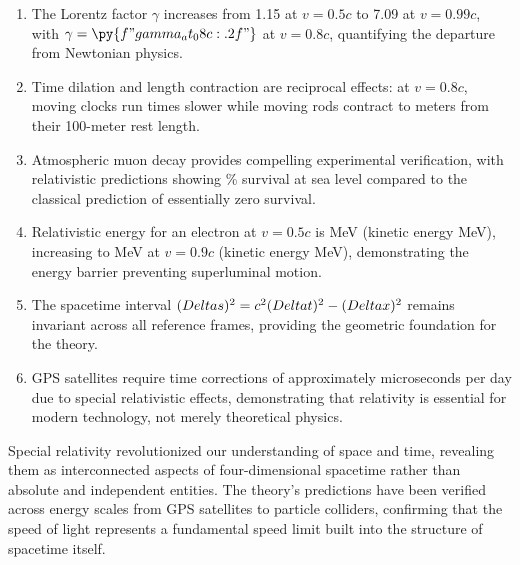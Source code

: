 \documentclass[a4paper, 11pt]{article}
\begin{document}
\begin{enumerate}
\item The Lorentz factor $\gamma$ increases from 1.15 at $v=0.5c$ to 7.09 at $v=0.99c$, with
$\gamma = \py{f"{gamma_at_08c:.2f}"}$ at $v=0.8c$, quantifying the departure from Newtonian physics.

\item Time dilation and length contraction are reciprocal effects: at $v=0.8c$, moving clocks
run  times slower while moving rods contract to
 meters from their 100-meter rest length.

\item Atmospheric muon decay provides compelling experimental verification, with relativistic
predictions showing \% survival at sea level
compared to the classical prediction of essentially zero survival.

\item Relativistic energy for an electron at $v=0.5c$ is  MeV
(kinetic energy  MeV), increasing to  MeV
at $v=0.9c$ (kinetic energy  MeV), demonstrating the energy barrier
preventing superluminal motion.

\item The spacetime interval $(\\Delta s)^2 = c^2(\\Delta t)^2 - (\\Delta x)^2$ remains
invariant across all reference frames, providing the geometric foundation for the theory.

\item GPS satellites require time corrections of approximately
 microseconds per day due to special relativistic
effects, demonstrating that relativity is essential for modern technology, not merely
theoretical physics.
\end{enumerate}

Special relativity revolutionized our understanding of space and time, revealing them as
interconnected aspects of four-dimensional spacetime rather than absolute and independent
entities. The theory's predictions have been verified across energy scales from GPS satellites
to particle colliders, confirming that the speed of light represents a fundamental speed limit
built into the structure of spacetime itself.
\end{document}
